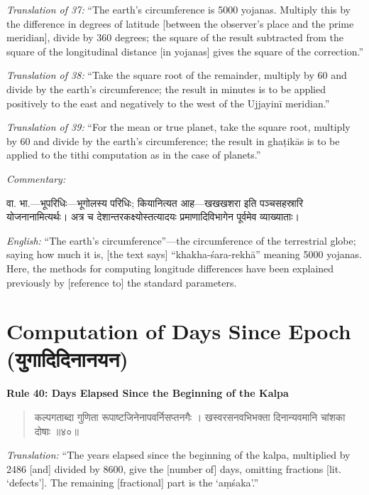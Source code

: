 \documentclass[11pt,a4paper]{book}
\newcommand{\dev}[1]{{\devanagarifont #1}}
\newenvironment{shloka}{%
  \begin{verse}
  \devanagarifont\color{versecolor}%
}{\end{verse}}
\newenvironment{vasaanaskt}{%
  \par\vspace{0.5em}\noindent\small\textit{Commentary:}%
}{\par\vspace{0.5em}}
\newcommand{\ruleheading}[1]{%
  \par\vspace{0.8em}\noindent\textbf{\color{sectioncolor}#1}\par\vspace{0.3em}%
}
\begin{document}
\textit{Translation of 37:} ``The earth's circumference is 5000 yojanas. Multiply this by the difference in degrees of latitude [between the observer's place and the prime meridian], divide by 360 degrees; the square of the result subtracted from the square of the longitudinal distance [in yojanas] gives the square of the correction.''

\textit{Translation of 38:} ``Take the square root of the remainder, multiply by 60 and divide by the earth's circumference; the result in minutes is to be applied positively to the east and negatively to the west of the Ujjayinī meridian.''

\textit{Translation of 39:} ``For the mean or true planet, take the square root, multiply by 60 and divide by the earth's circumference; the result in ghaṭikās is to be applied to the tithi computation as in the case of planets.''

\begin{vasaanaskt}
\dev{वा. भा.}---\dev{भूपरिधिः}---भूगोलस्य परिधिः; कियानित्यत आह---\dev{खखखशरा} इति पञ्चसहस्रारि योजनानामित्यर्थः। अत्र च देशान्तरकक्ष्योस्तत्यादयः प्रमाणादिविभागेन पूर्वमेव व्याख्याताः।

\textit{English:} ``The earth's circumference''---the circumference of the terrestrial globe; saying how much it is, [the text says] ``khakha-śara-rekhā'' meaning 5000 yojanas. Here, the methods for computing longitude differences have been explained previously by [reference to] the standard parameters.
\end{vasaanaskt}

\section{Computation of Days Since Epoch (\dev{युगादिदिनानयन})}

\ruleheading{Rule 40: Days Elapsed Since the Beginning of the Kalpa}

\begin{shloka}
\begin{altverse}
\dev{कल्पगताब्दा गुणिता रूपाष्टजिनेनापवर्निसप्तनगैः ।}
\dev{खस्वरसनवभिभक्ता दिनान्यवमानि चांशका दोषाः ॥४०॥}
\end{altverse}
\end{shloka}

\textit{Translation:} ``The years elapsed since the beginning of the kalpa, multiplied by 2486 [and] divided by 8600, give the [number of] days, omitting fractions [lit. `defects']. The remaining [fractional] part is the `aṃśaka'.''
\end{document}

